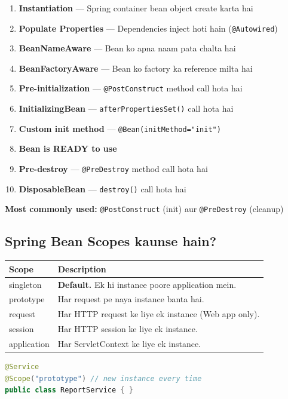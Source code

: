 \documentclass[12pt,a4paper]{article}
\begin{document}
\begin{answerbox}
\begin{enumerate}
    \item \textbf{Instantiation} --- Spring container bean object create karta hai
    \item \textbf{Populate Properties} --- Dependencies inject hoti hain (\texttt{@Autowired})
    \item \textbf{BeanNameAware} --- Bean ko apna naam pata chalta hai
    \item \textbf{BeanFactoryAware} --- Bean ko factory ka reference milta hai
    \item \textbf{Pre-initialization} --- \texttt{@PostConstruct} method call hota hai
    \item \textbf{InitializingBean} --- \texttt{afterPropertiesSet()} call hota hai
    \item \textbf{Custom init method} --- \texttt{@Bean(initMethod="init")}
    \item \textbf{Bean is READY to use}
    \item \textbf{Pre-destroy} --- \texttt{@PreDestroy} method call hota hai
    \item \textbf{DisposableBean} --- \texttt{destroy()} call hota hai
\end{enumerate}
\textbf{Most commonly used:} \texttt{@PostConstruct} (init) aur \texttt{@PreDestroy} (cleanup)
\end{answerbox}

\subsection{Spring Bean Scopes kaunse hain?}

\begin{answerbox}
\begin{center}
\begin{tabular}{>{\ttfamily}l p{8cm}}
\toprule
\textbf{Scope} & \textbf{Description} \\
\midrule
singleton & \textbf{Default.} Ek hi instance poore application mein. \\
prototype & Har request pe naya instance banta hai. \\
request & Har HTTP request ke liye ek instance (Web app only). \\
session & Har HTTP session ke liye ek instance. \\
application & Har ServletContext ke liye ek instance. \\
\bottomrule
\end{tabular}
\end{center}
\begin{lstlisting}[language=Java]
@Service
@Scope("prototype") // new instance every time
public class ReportService { }
\end{lstlisting}
\end{answerbox}
\end{document}
